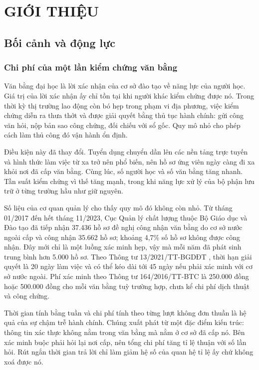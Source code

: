 \chapter{GIỚI THIỆU}
\label{chap:gioi-thieu}

\section{Bối cảnh và động lực}
\label{sec:boi-canh}

\subsection{Chi phí của một lần kiểm chứng văn bằng}

Văn bằng đại học là lời xác nhận của cơ sở đào tạo về năng lực của người học. Giá trị của lời xác nhận ấy chỉ tồn tại khi người khác kiểm chứng được nó. Trong thời kỳ thị trường lao động còn bó hẹp trong phạm vi địa phương, việc kiểm chứng diễn ra thưa thớt và được giải quyết bằng thủ tục hành chính: gửi công văn hỏi, nộp bản sao công chứng, đối chiếu với sổ gốc. Quy mô nhỏ cho phép cách làm thủ công đó vận hành ổn định.

Điều kiện này đã thay đổi. Tuyển dụng chuyển dần lên các nền tảng trực tuyến và hình thức làm việc từ xa trở nên phổ biến, nên hồ sơ ứng viên ngày càng đi xa khỏi nơi đã cấp văn bằng. Cùng lúc, số người học và số văn bằng tăng nhanh. Tần suất kiểm chứng vì thế tăng mạnh, trong khi năng lực xử lý của bộ phận lưu trữ ở từng trường hầu như giữ nguyên.

Số liệu của cơ quan quản lý cho thấy quy mô đó không còn nhỏ. Từ tháng 01/2017 đến hết tháng 11/2023, Cục Quản lý chất lượng thuộc Bộ Giáo dục và Đào tạo đã tiếp nhận 37.436 hồ sơ đề nghị công nhận văn bằng do cơ sở nước ngoài cấp và công nhận 35.662 hồ sơ; khoảng 4,7\% số hồ sơ không được công nhận. Đây mới chỉ là một luồng xác minh hẹp, vậy mà mỗi năm đã phát sinh trung bình hơn 5.000 hồ sơ. Theo Thông tư 13/2021/TT-BGDĐT \cite{TT13_2021}, thời hạn giải quyết là 20 ngày làm việc và có thể kéo dài tới 45 ngày nếu phải xác minh với cơ sở nước ngoài. Phí xác minh theo Thông tư 164/2016/TT-BTC \cite{TT164_2016} là 250.000 đồng hoặc 500.000 đồng cho mỗi văn bằng tuỳ trường hợp, chưa kể chi phí dịch thuật và công chứng.

Thời gian tính bằng tuần và chi phí tính theo từng lượt không đơn thuần là hệ quả của sự chậm trễ hành chính. Chúng xuất phát từ một đặc điểm kiến trúc: thông tin xác thực không nằm trong văn bằng mà nằm ở cơ sở đã cấp nó. Bên xác minh buộc phải hỏi lại nơi cấp, nên tổng chi phí tăng tỉ lệ thuận với số lần hỏi. Rút ngắn thời gian trả lời chỉ làm giảm hệ số của quan hệ tỉ lệ ấy chứ không xoá được nó.

